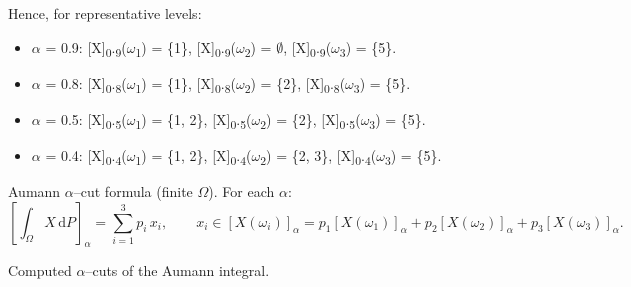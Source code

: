 \documentclass[12pt,a4paper]{report}
\numberwithin{equation}{section}
\begin{document}
Hence, for representative levels:

\begin{itemize}
\item
  $\alpha$ = 0.9: {[}X{]}\textsubscript{0}.\textsubscript{9}($\omega$\textsubscript{1}) = \{1\}, {[}X{]}\textsubscript{0}.\textsubscript{9}($\omega$\textsubscript{2}) = $\emptyset$, {[}X{]}\textsubscript{0}.\textsubscript{9}($\omega$\textsubscript{3}) =
  \{5\}.
\item
  $\alpha$ = 0.8: {[}X{]}\textsubscript{0}.\textsubscript{8}($\omega$\textsubscript{1}) = \{1\}, {[}X{]}\textsubscript{0}.\textsubscript{8}($\omega$\textsubscript{2}) = \{2\},
  {[}X{]}\textsubscript{0}.\textsubscript{8}($\omega$\textsubscript{3}) = \{5\}.
\item
  $\alpha$ = 0.5: {[}X{]}\textsubscript{0}.\textsubscript{5}($\omega$\textsubscript{1}) = \{1, 2\}, {[}X{]}\textsubscript{0}.\textsubscript{5}($\omega$\textsubscript{2}) = \{2\},
  {[}X{]}\textsubscript{0}.\textsubscript{5}($\omega$\textsubscript{3}) = \{5\}.
\item
  $\alpha$ = 0.4: {[}X{]}\textsubscript{0}.\textsubscript{4}($\omega$\textsubscript{1}) = \{1, 2\}, {[}X{]}\textsubscript{0}.\textsubscript{4}($\omega$\textsubscript{2}) = \{2, 3\},
  {[}X{]}\textsubscript{0}.\textsubscript{4}($\omega$\textsubscript{3}) = \{5\}.
\end{itemize}

Aumann $\alpha$--cut formula (finite $\Omega$). For each $\alpha$:
\[
\left[\int_{\Omega} X\,\mathrm{d}P\right]_{\alpha}
= \sum_{i=1}^{3} p_i\,x_i,
\qquad x_i\in [X(\omega_i)]_{\alpha}
= p_{1}[X(\omega_{1})]_{\alpha}
  + p_{2}[X(\omega_{2})]_{\alpha}
  + p_{3}[X(\omega_{3})]_{\alpha}.
\]


Computed $\alpha$--cuts of the Aumann integral.
\end{document}
